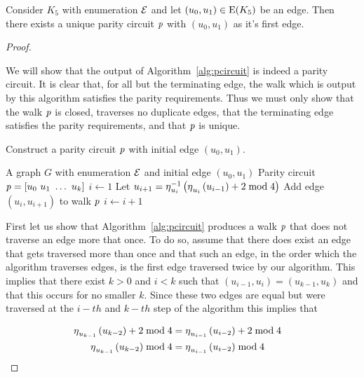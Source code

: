 \begin{theorem}
  \label{thm:p-circuit_existance}
Consider $K_5$ with enumeration $\operatorname{\mathcal{E}}$ and let $\left(u_0 , u_1 \right) \in \mathrm{E}(K_5) $ be an edge.  Then there exists a unique parity circuit $\operatorname{\mathit{p}}$ with $\left(u_0, u_1\right)$ as it's first edge.   
\end{theorem}
\begin{proof}
  \label{pf:p-circuit_existance}

We will show that the output of Algorithm~\ref{alg:pcircuit} is indeed a parity circuit. It is clear that, for all but the terminating edge, the walk which is output by this algorithm satisfies the parity requirements. Thus we must only show that the walk $\operatorname{\mathit{p}}$ is closed, traverses no duplicate edges, that the terminating edge satisfies the parity requirements, and that $\operatorname{\mathit{p}}$ is unique.  
  
\begin{algorithm}[b]
\caption{Construct a parity circuit $\operatorname{\mathit{p}}$ with initial edge $\left(u_0, u_1 \right)$.}
\label{alg:pcircuit}
\begin{algorithmic}
  \REQUIRE A graph $G$ with enumeration $\operatorname{\mathcal{E}}$ and initial edge $\left(u_0,u_1\right)$
  \ENSURE Parity circuit $\ppath = \left[ u_0\  u_1\ \ldots\  u_k  \right]$
  \STATE $i \leftarrow 1$ 
  \STATE Let $u_{i+1} = \operatorname{\eta}_{u_i}^{-1}\left(\operatorname{\eta}_{u_{i}}\left(u_{i-1} \right) + 2 \bmod{4}\right)$
  \STATE Add edge $\left(u_{i}, u_{i+1} \right)$ to walk $\operatorname{\mathit{p}}$ 
  \STATE $i \leftarrow i + 1$ 
  \ENDWHILE
\end{algorithmic}
\end{algorithm}

First let us show that Algorithm~\ref{alg:pcircuit} produces a walk $\operatorname{\mathit{p}}$ that does not traverse an edge more that once. To do so, assume that there does exist an edge that gets traversed more than once and that such an edge, in the order which the algorithm traverses edges, is the first edge traversed twice by our algorithm. This implies that there exist $k > 0$ and $i < k$ such that $\left(u_{i-1}, u_{i} \right) = \left(u_{k-1} , u_{k} \right)$ and that this occurs for no smaller $k$. Since these two edges are equal but were traversed at the $i-th$ and $k-th$ step of the algorithm this implies that 

\begin{align*}
    \operatorname{\eta}_{u_{k-1}}\left( u_{k-2} \right) + 2 \bmod{4} &= \operatorname{\eta}_{u_{i-1}}\left(u_{i-2} \right) + 2 \bmod{4} &       \\
    \operatorname{\eta}_{u_{k-1}}\left( u_{k-2} \right) \bmod{4} &= \operatorname{\eta}_{u_{i-1}}\left(u_{i-2} \right) \bmod{4} & \\
\end{align*}


\end{proof}

